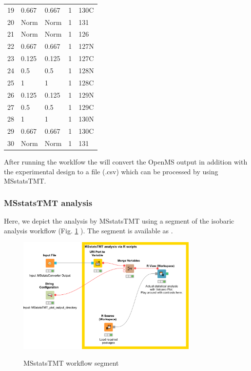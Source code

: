 \begin{table}[ht]
\begin{tabular*}{0.90\textwidth}{lllll}
19     & 0.667              & 0.667                 & 1                & 130C      \\
20     & Norm               & Norm                  & 1                & 131       \\
21     & Norm               & Norm                  & 1                & 126       \\
22     & 0.667              & 0.667                 & 1                & 127N      \\
23     & 0.125              & 0.125                 & 1                & 127C      \\
24     & 0.5                & 0.5                   & 1                & 128N      \\
25     & 1                  & 1                     & 1                & 128C      \\
26     & 0.125              & 0.125                 & 1                & 129N      \\
27     & 0.5                & 0.5                   & 1                & 129C      \\
28     & 1                  & 1                     & 1                & 130N      \\
29     & 0.667              & 0.667                 & 1                & 130C      \\
30     & Norm               & Norm                  & 1                & 131   
\end{tabular*}
\end{table}

\noindent After running the worklfow the  will convert the OpenMS output in addition with the experimental design to a file (.csv) which can be processed by using MSstatsTMT.

\subsubsection{MSstatsTMT analysis}
Here, we depict the analysis by MSstatsTMT using a segment of the isobaric analysis workflow (Fig. \ref{fig:isobaric_msstatstmtwf} ). The segment is available as . \\

\begin{figure}[htbp]
\caption{MSstatsTMT workflow segment}
\centering
\includegraphics[width=0.80\textwidth]{graphics/isobaric/isobaric_msstatstmt_wf.png}
 \label{fig:isobaric_msstatstmtwf}
\end{figure}

